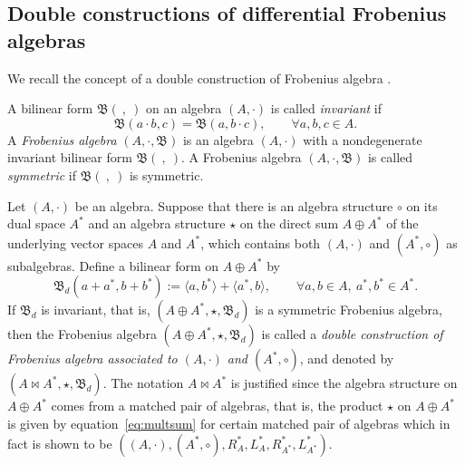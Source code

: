 \documentclass[pdftex]{sigma}
\numberwithin{equation}{section}
\begin{document}
\subsection{Double constructions of differential Frobenius algebras}\label{subsec:double}
We recall the concept of a double construction of Frobenius algebra \cite{BaiDouble}.

\begin{Definition}\label{def:invariant_bilinear_form}
 A bilinear form $\mathfrak{B}(\ ,\ )$ on an algebra $(A, \cdot)$ is called \textit{invariant} if
 \begin{equation*}
 \mathfrak{B}(a \cdot b, c) = \mathfrak{B}(a, b \cdot c), \qquad
 \forall a, b, c \in A.
 \end{equation*}
 A \textit{Frobenius algebra} $(A, \cdot, \mathfrak{B})$ is an algebra $(A, \cdot)$ with a nondegenerate invariant bilinear form $\mathfrak{B}(\ , \ )$.
 A Frobenius algebra $(A, \cdot, \mathfrak{B})$ is called \textit{symmetric} if $\mathfrak{B}(\ , \ )$ is symmetric.
\end{Definition}

Let $(A, \cdot)$ be an algebra.
Suppose that there is an algebra structure $\circ$ on its dual space $A^*$ and an algebra structure $\star$ on the direct sum $A \oplus A^*$ of the underlying vector spaces $A$ and $A^*$, which contains both $(A, \cdot)$ and $(A^*, \circ)$ as subalgebras.
Define a bilinear form on $A \oplus A^*$ by
\begin{equation}
 \mathfrak{B}_d(a + a^*, b + b^*) := \langle a, b^* \rangle + \langle a^*, b \rangle , \qquad
 \forall a, b \in A, \ a^*, b^* \in A^*. \label{eq:bilform}
\end{equation}
If $\mathfrak{B}_d$ is invariant, that is,
$(A \oplus A^*, \star, \mathfrak{B}_d)$ is a symmetric Frobenius algebra,
then the Frobenius algebra $(A \oplus A^*, \star, \mathfrak{B}_d)$ is called a
\textit{double construction of Frobenius algebra associated to $(A, \cdot)$ and $(A^*, \circ)$},
and denoted by $(A \bowtie A^*, \star , \mathfrak{B}_d)$.
The notation $A \bowtie A^*$ is justified since the algebra structure on $A \oplus A^*$ comes from a matched pair of algebras, that is, the product $\star$ on $A \oplus A^*$ is given by equation~\eqref{eq:multsum} for certain matched pair of algebras which in fact is shown to be $((A, \cdot), (A^*, \circ), R^*_A, L^*_A, R^*_{A^*}, L^*_{A^*})$.
\end{document}

